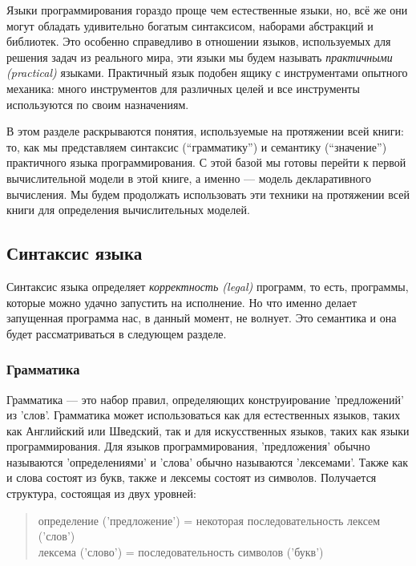 Языки программирования гораздо проще чем естественные языки, но, всё же они могут обладать удивительно богатым синтаксисом, наборами абстракций и библиотек. Это особенно справедливо в отношении языков, используемых для решения задач из реального мира, эти языки мы будем называть \emph{практичными (practical)} языками. Практичный язык подобен ящику с инструментами опытного механика: много инструментов для различных целей и все инструменты используются по своим назначениям.

В этом разделе раскрываются понятия, используемые на протяжении всей книги: то, как мы представляем синтаксис (``грамматику'') и семантику (``значение'') практичного языка программирования. С этой базой мы готовы перейти к первой вычислительной модели в этой книге, а именно --- модель декларативного вычисления. Мы будем продолжать использовать эти техники на протяжении всей книги для определения вычислительных моделей.

\subsection{Синтаксис языка}

Синтаксис языка определяет \emph{корректность (legal)} программ, то есть, программы, которые можно удачно запустить на исполнение. Но что именно делает запущенная программа нас, в данный момент, не волнует. Это семантика и она будет рассматриваться в следующем разделе.

\subsubsection{Грамматика}

Грамматика --- это набор правил, определяющих конструирование 'предложений' из 'слов'. Грамматика может использоваться как для естественных языков, таких как Английский или Шведский, так и для искусственных языков, таких как языки программирования. Для языков программирования, 'предложения' обычно называются 'определениями' и 'слова' обычно называются 'лексемами'. Также как и слова состоят из букв, также и лексемы состоят из символов. Получается структура, состоящая из двух уровней:

\begin{quote}
определение ('предложение') = некоторая последовательность лексем ('слов') \\
лексема ('слово') = последовательность символов ('букв')
\end{quote}


